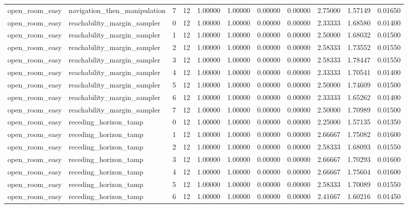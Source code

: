\documentclass{article}
\begin{document}
\begin{table}[tbp]
{\begin{tabular}{lllllllllll}
open\_room\_easy & navigation\_then\_manipulation & 7 & 12 & 1.00000 & 1.00000 & 0.00000 & 0.00000 & 2.75000 & 1.57149 & 0.01650 \\
open\_room\_easy & reachability\_margin\_sampler & 0 & 12 & 1.00000 & 1.00000 & 0.00000 & 0.00000 & 2.33333 & 1.68580 & 0.01400 \\
open\_room\_easy & reachability\_margin\_sampler & 1 & 12 & 1.00000 & 1.00000 & 0.00000 & 0.00000 & 2.50000 & 1.68032 & 0.01500 \\
open\_room\_easy & reachability\_margin\_sampler & 2 & 12 & 1.00000 & 1.00000 & 0.00000 & 0.00000 & 2.58333 & 1.73552 & 0.01550 \\
open\_room\_easy & reachability\_margin\_sampler & 3 & 12 & 1.00000 & 1.00000 & 0.00000 & 0.00000 & 2.58333 & 1.78447 & 0.01550 \\
open\_room\_easy & reachability\_margin\_sampler & 4 & 12 & 1.00000 & 1.00000 & 0.00000 & 0.00000 & 2.33333 & 1.70541 & 0.01400 \\
open\_room\_easy & reachability\_margin\_sampler & 5 & 12 & 1.00000 & 1.00000 & 0.00000 & 0.00000 & 2.50000 & 1.74609 & 0.01500 \\
open\_room\_easy & reachability\_margin\_sampler & 6 & 12 & 1.00000 & 1.00000 & 0.00000 & 0.00000 & 2.33333 & 1.65262 & 0.01400 \\
open\_room\_easy & reachability\_margin\_sampler & 7 & 12 & 1.00000 & 1.00000 & 0.00000 & 0.00000 & 2.50000 & 1.70989 & 0.01500 \\
open\_room\_easy & receding\_horizon\_tamp & 0 & 12 & 1.00000 & 1.00000 & 0.00000 & 0.00000 & 2.25000 & 1.57135 & 0.01350 \\
open\_room\_easy & receding\_horizon\_tamp & 1 & 12 & 1.00000 & 1.00000 & 0.00000 & 0.00000 & 2.66667 & 1.75082 & 0.01600 \\
open\_room\_easy & receding\_horizon\_tamp & 2 & 12 & 1.00000 & 1.00000 & 0.00000 & 0.00000 & 2.58333 & 1.68093 & 0.01550 \\
open\_room\_easy & receding\_horizon\_tamp & 3 & 12 & 1.00000 & 1.00000 & 0.00000 & 0.00000 & 2.66667 & 1.70293 & 0.01600 \\
open\_room\_easy & receding\_horizon\_tamp & 4 & 12 & 1.00000 & 1.00000 & 0.00000 & 0.00000 & 2.66667 & 1.75604 & 0.01600 \\
open\_room\_easy & receding\_horizon\_tamp & 5 & 12 & 1.00000 & 1.00000 & 0.00000 & 0.00000 & 2.58333 & 1.70089 & 0.01550 \\
open\_room\_easy & receding\_horizon\_tamp & 6 & 12 & 1.00000 & 1.00000 & 0.00000 & 0.00000 & 2.41667 & 1.60216 & 0.01450 \\

\end{tabular}}
\end{table}
\end{document}
